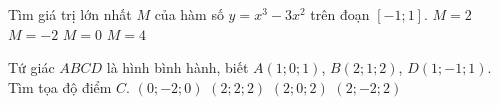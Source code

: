 \begin{ex}%
	Tìm giá trị lớn nhất $M$ của hàm số $y=x^3-3x^2$ trên đoạn $[-1;1]$.
	\choice
	{$M=2$}
	{$M=-2$}
	{\True $M=0$}
	{$M=4$}
\end{ex}

\begin{ex}%
	Tứ giác $ABCD$ là hình bình hành, biết $A(1; 0; 1)$, $B(2; 1; 2)$, $D(1; -1; 1)$. Tìm tọa độ điểm $C$.
	\choice
	{$(0; -2; 0)$}
	{$(2; 2; 2)$}
	{\True $(2; 0; 2)$}
	{$(2; -2; 2)$}
\end{ex}

